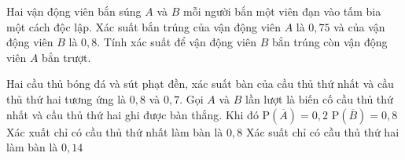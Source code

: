 \begin{bt}%

    Hai vận động viên bắn súng $A$ và $B$ mỗi người bắn một viên đạn vào tấm bia một cách độc lập. Xác suất bắn trúng của vận động viên $A$ là $0{,}75$ và của vận động viên $B$ là $0{,}8$. Tính xác suất để vận động viên $B$ bắn trúng còn vận động viên $A$ bắn trượt.
\end{bt}

\begin{ex}%

	Hai cầu thủ bóng đá và sút phạt đền, xác suất bàn của cầu thủ thứ nhất và cầu thủ thứ hai tương ứng là $0{,}8$ và $0{,}7$. Gọi $A$ và $B$ lần lượt là biến cố cầu thủ thứ nhất và cầu thủ thứ hai ghi được bàn thắng. Khi đó
	\choiceTF
	{\True $\mathrm{P}\left(\overline{A}\right)=0{,}2$}
	{$\mathrm{P}\left(\overline{B}\right)=0{,}8$}
	{Xác xuất chỉ có cầu thủ thứ nhất làm bàn là $0{,}8$}
	{\True Xác suất chỉ có cầu thủ thứ hai làm bàn là $0{,}14$}
\end{ex}

